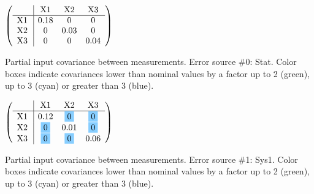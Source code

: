 \begin{table}[H]
\scriptsize
\begin{center}
\renewcommand{\arraystretch}{1.1}
\begin{math}\left(\begin{array}{c|ccc}
 & \mathrm{X1} & 
\mathrm{X2} & 
\mathrm{X3} \\
\hline
\mathrm{X1} \hspace*{2pt} &       0.18 &  0 &  0 \\
\mathrm{X2} \hspace*{2pt} &  0 &       0.03 &  0 \\
\mathrm{X3} \hspace*{2pt} &  0 &  0 &       0.04 \\
\end{array}\right)\end{math}
\caption{Partial input covariance between measurements. Error source \#0: Stat. Color boxes indicate covariances lower than nominal values by a factor up to 2 (green), up to 3 (cyan) or greater than 3 (blue).}
\renewcommand{\arraystretch}{1}
\end{center}
\end{table}
\begin{table}[H]
\scriptsize
\begin{center}
\renewcommand{\arraystretch}{1.1}
\begin{math}\left(\begin{array}{c|ccc}
 & \mathrm{X1} & 
\mathrm{X2} & 
\mathrm{X3} \\
\hline
\mathrm{X1} \hspace*{2pt} &       0.12 &  \colorbox{SkyBlue1}{$ 0$} &  \colorbox{SkyBlue1}{$ 0$} \\
\mathrm{X2} \hspace*{2pt} &  \colorbox{SkyBlue1}{$ 0$} &       0.01 &  \colorbox{SkyBlue1}{$ 0$} \\
\mathrm{X3} \hspace*{2pt} &  \colorbox{SkyBlue1}{$ 0$} &  \colorbox{SkyBlue1}{$ 0$} &       0.06 \\
\end{array}\right)\end{math}
\caption{Partial input covariance between measurements. Error source \#1: Sys1. Color boxes indicate covariances lower than nominal values by a factor up to 2 (green), up to 3 (cyan) or greater than 3 (blue).}
\renewcommand{\arraystretch}{1}
\end{center}
\end{table}
